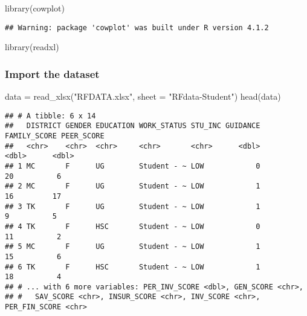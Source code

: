 \documentclass[
]{article}
\newenvironment{Shaded}{\begin{snugshade}}{\end{snugshade}}
\newcommand{\AttributeTok}[1]{\textcolor[rgb]{0.77,0.63,0.00}{#1}}
\newcommand{\FunctionTok}[1]{\textcolor[rgb]{0.00,0.00,0.00}{#1}}
\newcommand{\NormalTok}[1]{#1}
\newcommand{\OtherTok}[1]{\textcolor[rgb]{0.56,0.35,0.01}{#1}}
\newcommand{\StringTok}[1]{\textcolor[rgb]{0.31,0.60,0.02}{#1}}
\begin{document}
\begin{Shaded}
\begin{Highlighting}[]
\FunctionTok{library}\NormalTok{(cowplot)}
\end{Highlighting}
\end{Shaded}

\begin{verbatim}
## Warning: package 'cowplot' was built under R version 4.1.2
\end{verbatim}

\begin{Shaded}
\begin{Highlighting}[]
\FunctionTok{library}\NormalTok{(readxl)}
\end{Highlighting}
\end{Shaded}

\hypertarget{import-the-dataset}{%
\subsubsection{Import the dataset}\label{import-the-dataset}}

\begin{Shaded}
\begin{Highlighting}[]
\NormalTok{data }\OtherTok{=} \FunctionTok{read\_xlsx}\NormalTok{(}\StringTok{"RFDATA.xlsx"}\NormalTok{, }\AttributeTok{sheet =} \StringTok{"RFdata{-}Student"}\NormalTok{)}
\FunctionTok{head}\NormalTok{(data)}
\end{Highlighting}
\end{Shaded}

\begin{verbatim}
## # A tibble: 6 x 14
##   DISTRICT GENDER EDUCATION WORK_STATUS STU_INC GUIDANCE FAMILY_SCORE PEER_SCORE
##   <chr>    <chr>  <chr>     <chr>       <chr>      <dbl>        <dbl>      <dbl>
## 1 MC       F      UG        Student - ~ LOW            0           20          6
## 2 MC       F      UG        Student - ~ LOW            1           16         17
## 3 TK       F      UG        Student - ~ LOW            1            9          5
## 4 TK       F      HSC       Student - ~ LOW            0           11          2
## 5 MC       F      UG        Student - ~ LOW            1           15          6
## 6 TK       F      HSC       Student - ~ LOW            1           18          4
## # ... with 6 more variables: PER_INV_SCORE <dbl>, GEN_SCORE <chr>,
## #   SAV_SCORE <chr>, INSUR_SCORE <chr>, INV_SCORE <chr>, PER_FIN_SCORE <chr>
\end{verbatim}
\end{document}
